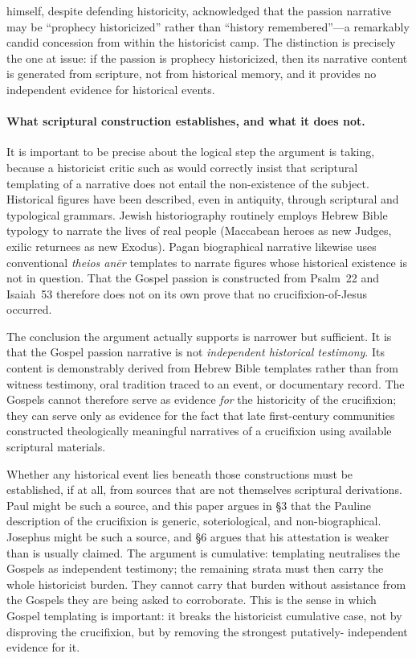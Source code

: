 \documentclass[12pt,oneside]{article}
\begin{document}
\citet{Crossan1995} himself, despite defending historicity, acknowledged
that the passion narrative may be ``prophecy historicized'' rather than
``history remembered''---a remarkably candid concession from within the
historicist camp.  The distinction is precisely the one at issue: if the
passion is prophecy historicized, then its narrative content is
generated from scripture, not from historical memory, and it provides no
independent evidence for historical events.

\paragraph{What scriptural construction establishes, and what it does not.}
It is important to be precise about the logical step the argument is
taking, because a historicist critic such as \citet{Allison2010} would
correctly insist that scriptural templating of a narrative does not
entail the non-existence of the subject.  Historical figures have been
described, even in antiquity, through scriptural and typological
grammars.  Jewish historiography routinely employs Hebrew Bible
typology to narrate the lives of real people (Maccabean heroes as new
Judges, exilic returnees as new Exodus).  Pagan biographical narrative
likewise uses conventional \textit{theios an\=er} templates to narrate
figures whose historical existence is not in question.  That the
Gospel passion is constructed from Psalm~22 and Isaiah~53 therefore
does not on its own prove that no crucifixion-of-Jesus occurred.

The conclusion the argument actually supports is narrower but
sufficient.  It is that the Gospel passion narrative is not
\textit{independent historical testimony}.  Its content is demonstrably
derived from Hebrew Bible templates rather than from witness
testimony, oral tradition traced to an event, or documentary record.
The Gospels cannot therefore serve as evidence \textit{for} the
historicity of the crucifixion; they can serve only as evidence for
the fact that late first-century communities constructed
theologically meaningful narratives of a crucifixion using available
scriptural materials.

Whether any historical event lies beneath those constructions must be
established, if at all, from sources that are not themselves
scriptural derivations.  Paul might be such a source, and this paper
argues in §3 that the Pauline description of the crucifixion is
generic, soteriological, and non-biographical.  Josephus might be such
a source, and §6 argues that his attestation is weaker than is
usually claimed.  The argument is cumulative: templating neutralises
the Gospels as independent testimony; the remaining strata must then
carry the whole historicist burden.  They cannot carry that burden
without assistance from the Gospels they are being asked to
corroborate.  This is the sense in which Gospel templating is
important: it breaks the historicist cumulative case, not by
disproving the crucifixion, but by removing the strongest putatively-
independent evidence for it.
\end{document}
